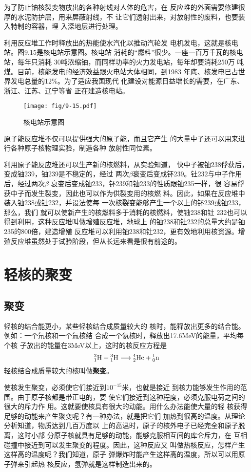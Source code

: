 为了防止铀核裂变物放出的各种射线对人体的危害，在
反应堆的外面需要修建很厚的水泥防护层，用来屏蔽射线，不
让它们透射出来，对放射性的废料，也要装入特制的容器，埋
入深地层进行处理。

利用反应堆工作时释放出的热能使水汽化以推动汽轮发
电机发电，这就是核电站。图9.15是核电站示意图。核电站
消耗的“燃料”很少。一座一百万千瓦的核电站，每年只消耗
30吨浓缩铀，而同样功率的火力发电站，每年却要消耗250万
吨煤。目前，核能发电的经济效益跟火电站大体相同，到1983
年底、核发电已占世界发电总量的12\%。为了适应我国现代
化建设对能源日益增长的需要，在广东、浙江、江苏、辽宁等省
正在建造核电站。

\begin{figure}[htp]
    \centering
    \texttt{[image: fig/9-15.pdf]}
    \caption{核电站示意图}
\end{figure}

原子能反应堆不仅可以提供强大的原子能，而且它产生
的大量中子还可以用来进行各种原子核物理实验，制造各种
放射性同位素。

利用原子能反应堆还可以生产新的核燃料，从实验知道，
快中子被铀238俘获后，变成铀239，铀239是不稳定的，经过
两次$\beta$衰变后变成钚239。钍232与中子作用后，经过两次$\beta$
衰变后变成铀233，钚239和铀233的性质跟铀235一样，很
容易俘获中子而发生裂变，因此也可以作为供裂变用的核燃
料。因此，如果在反应堆中装入铀238或钍232，并设法使每
一次核裂变能够产生一个以上的钚239或铀233，那么，我们
就可以使新产生的核燃料多于消耗的核燃料，使铀238和钍
232也可以得到利用，这种反应堆叫做增殖反应堆，地球上
的铀238和钍232的总量大约是铀235的800倍，建造增殖
反应堆可以利用铀238和钍232，更有效地利用核资源。增
殖反应堆虽然处于试验阶段，但从长远来看是很有前途的。

\section{轻核的聚变}
\subsection{聚变}
轻核的结合能更小，某些轻核结合成质量较大的
核时，能释放出更多的结合能。例如：一个氘核和一个氚核结
合成一个氨核时，释放出17.6MeV的能量，平均每个核
子放出的能量在3MeV以上，这时的核反应方程是
\[\atom{H}{2}{1}+\atom{H}{3}{1}\longrightarrow \atom{He}{4}{2}+\atom{n}{1}{0} 
    \]
轻核结合成质量较大的核叫做\textbf{聚变}。

使核发生聚变，必须使它们接近到$10^{-15}$米，也就是接近
到核力能够发生作用的范围。由于原子核都是带正电的，要
使它们接近到这种程度，必须克服电荷之间的很大的斥力作
用。这就要使核具有很大的动能。用什么办法能使大量的轻
核获得足够的动能来产生聚变呢？有一种办法，就是把它们
加热到很高的温度。从理论分析知道，物质达到几百万度以
上的高温时，原子的核外电子已经完全和原子脱离，这时小部
分原子核就具有足够的动能，能够克服相互间的库仑斥力，在
互相碰撞中接近到可以发生聚变的程度。因此，这种反应又
叫做热核反应，怎样产生这样高的温度呢？我们知道，原子
弹爆炸时能产生这样高的温度，所以可以用原子弹来引起热
核反应，氢弹就是这样制造出来的。


